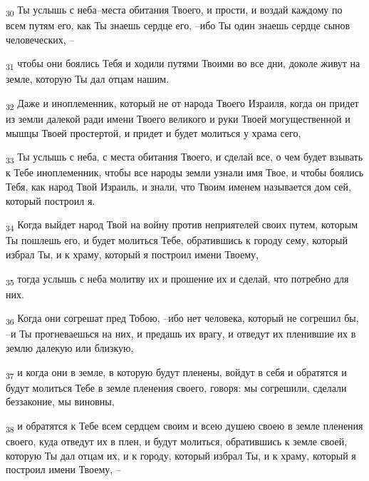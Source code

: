 \begin{tcolorbox}
\textsubscript{30} Ты услышь с неба--места обитания Твоего, и прости, и воздай каждому по всем путям его, как Ты знаешь сердце его, --ибо Ты один знаешь сердце сынов человеческих, --
\end{tcolorbox}
\begin{tcolorbox}
\textsubscript{31} чтобы они боялись Тебя и ходили путями Твоими во все дни, доколе живут на земле, которую Ты дал отцам нашим.
\end{tcolorbox}
\begin{tcolorbox}
\textsubscript{32} Даже и иноплеменник, который не от народа Твоего Израиля, когда он придет из земли далекой ради имени Твоего великого и руки Твоей могущественной и мышцы Твоей простертой, и придет и будет молиться у храма сего,
\end{tcolorbox}
\begin{tcolorbox}
\textsubscript{33} Ты услышь с неба, с места обитания Твоего, и сделай все, о чем будет взывать к Тебе иноплеменник, чтобы все народы земли узнали имя Твое, и чтобы боялись Тебя, как народ Твой Израиль, и знали, что Твоим именем называется дом сей, который построил я.
\end{tcolorbox}
\begin{tcolorbox}
\textsubscript{34} Когда выйдет народ Твой на войну против неприятелей своих путем, которым Ты пошлешь его, и будет молиться Тебе, обратившись к городу сему, который избрал Ты, и к храму, который я построил имени Твоему,
\end{tcolorbox}
\begin{tcolorbox}
\textsubscript{35} тогда услышь с неба молитву их и прошение их и сделай, что потребно для них.
\end{tcolorbox}
\begin{tcolorbox}
\textsubscript{36} Когда они согрешат пред Тобою, --ибо нет человека, который не согрешил бы, --и Ты прогневаешься на них, и предашь их врагу, и отведут их пленившие их в землю далекую или близкую,
\end{tcolorbox}
\begin{tcolorbox}
\textsubscript{37} и когда они в земле, в которую будут пленены, войдут в себя и обратятся и будут молиться Тебе в земле пленения своего, говоря: мы согрешили, сделали беззаконие, мы виновны,
\end{tcolorbox}
\begin{tcolorbox}
\textsubscript{38} и обратятся к Тебе всем сердцем своим и всею душею своею в земле пленения своего, куда отведут их в плен, и будут молиться, обратившись к земле своей, которую Ты дал отцам их, и к городу, который избрал Ты, и к храму, который я построил имени Твоему, --
\end{tcolorbox}
